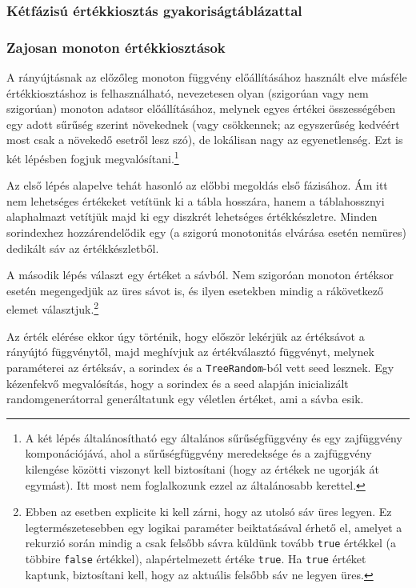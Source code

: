 \documentclass[
    parspace,
    noindent,
    nohyp,
]{elteiktdk}[2023/04/10]
\begin{document}

\subsubsection{Kétfázisú értékkiosztás gyakoriságtáblázattal}


\subsubsection{Zajosan monoton értékkiosztások}

A rányújtásnak az előzőleg monoton függvény előállításához használt elve
másféle értékkiosztáshoz is felhasználható,
nevezetesen olyan (szigorúan vagy nem szigorúan) monoton adatsor előállításához,
melynek egyes értékei összességében egy adott sűrűség szerint növekednek
(vagy csökkennek; az egyszerűség kedvéért most csak a növekedő esetről lesz szó),
de lokálisan nagy az egyenetlenség.
Ezt is két lépésben fogjuk megvalósítani.\footnote{
  A két lépés általánosítható egy általános sűrűségfüggvény és egy zajfüggvény komponációjává,
  ahol a sűrűségfüggvény meredeksége és a zajfüggvény kilengése közötti viszonyt kell biztosítani
  (hogy az értékek ne ugorják át egymást).
  Itt most nem foglalkozunk ezzel az általánosabb kerettel.
}

Az első lépés alapelve tehát hasonló az előbbi megoldás első fázisához.
Ám itt nem lehetséges értékeket vetítünk ki a tábla hosszára,
hanem a táblahossznyi alaphalmazt vetítjük majd ki egy diszkrét lehetséges értékkészletre.
Minden sorindexhez hozzárendelődik egy (a szigorú monotonitás elvárása esetén nemüres)
dedikált sáv az értékkészletből.

A második lépés választ egy értéket a sávból.
Nem szigoróan monoton értéksor esetén megengedjük az üres sávot is,
és ilyen esetekben mindig a rákövetkező elemet választjuk.\footnote{
  Ebben az esetben explicite ki kell zárni, hogy az utolsó sáv üres legyen.
  Ez legtermészetesebben egy logikai paraméter beiktatásával érhető el,
  amelyet a rekurzió során mindig a csak felsőbb sávra küldünk tovább \texttt{true} értékkel
  (a többire \texttt{false} értékkel),
  alapértelmezett értéke \texttt{true}.
  Ha \texttt{true} értéket kaptunk, biztosítani kell, hogy az aktuális felsőbb sáv ne legyen üres.
}

Az érték elérése ekkor úgy történik, hogy először lekérjük az értéksávot a rányújtó függvénytől,
majd meghívjuk az értékválasztó függvényt,
melynek paraméterei az értéksáv, a sorindex és a \texttt{TreeRandom}-ból vett seed lesznek.
Egy kézenfekvő megvalósítás,
hogy a sorindex és a seed alapján inicializált randomgenerátorral
generáltatunk egy véletlen értéket, ami a sávba esik.
\end{document}
